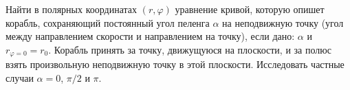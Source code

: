 Найти в полярных координатах $(r, \varphi)$ уравнение кривой,
которую опишет корабль, сохраняющий постоянный угол пеленга $\alpha$
на неподвижную точку (угол между направлением скорости и направлением на точку),
если дано: $\alpha$ и $r_{\varphi = 0} = r_0$.
Корабль принять за точку, движущуюся на плоскости,
и за полюс взять произвольную неподвижную точку в этой плоскости.
Исследовать частные случаи $\alpha = 0$, $\pi/2$ и $\pi$.

